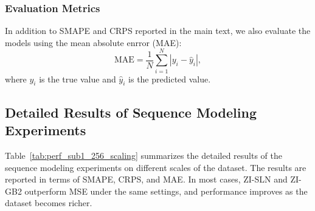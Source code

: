 \subsubsection{Evaluation Metrics}
In addition to SMAPE and CRPS reported in the main text, we also evaluate the models using the mean absolute enrror (MAE):
\begin{equation}
    \text{MAE} = \frac{1}{N} \sum_{i=1}^N |y_i - \hat{y}_i|,
\end{equation}
where $y_i$ is the true value and $\hat{y}_i$ is the predicted value.

\subsection{Detailed Results of Sequence Modeling Experiments}
\label{subsec:detailed_results}

Table~\ref{tab:perf_sub1_256_scaling} summarizes the detailed results of the sequence modeling experiments on different scales of the dataset. The results are reported in terms of SMAPE, CRPS, and MAE. In most cases, ZI-SLN and ZI-GB2 outperform MSE under the same settings, and performance improves as the dataset becomes richer.

